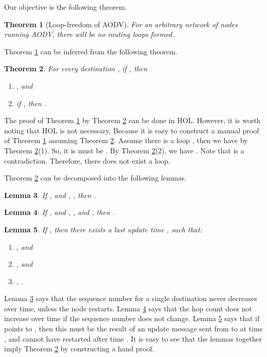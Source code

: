 \documentclass[a4paper,10pt,twocolumn]{article}
\newtheorem{theorem}{Theorem}
\newtheorem{lemma}[theorem]{Lemma}
\begin{document}
Our objective is the following theorem.
\begin{theorem}[Loop-freedom of AODV]\label{BOG02:Lem16}
For an arbitrary network of nodes running AODV, there will be no routing loops formed.
\end{theorem}
Theorem \ref{BOG02:Lem16} can be inferred from the following theorem.
\begin{theorem}\label{BOG02:Lem17}
For every destination , if , then
\begin{enumerate}
  \item , and
  \item if , then .
\end{enumerate}
\end{theorem}
The proof of Theorem \ref{BOG02:Lem16} by Theorem \ref{BOG02:Lem17} can be done in HOL. However, it is worth noting that HOL is not necessary. Because it is easy to construct a manual proof of Theorem \ref{BOG02:Lem16} assuming Theorem \ref{BOG02:Lem17}. Assume there is a loop , then we have  by Theorem \ref{BOG02:Lem17}(1). So, it is must be . By Theorem \ref{BOG02:Lem17}(2), we have . Note that  is a contradiction. Therefore, there does not exist a loop.

Theorem \ref{BOG02:Lem17} can be decomposed into the following lemmas.
\begin{lemma}\label{BOG02:Lem18}
If , and , , then .
\end{lemma}
\begin{lemma}\label{BOG02:Lem19}
If , and , , and , then .
\end{lemma}
\begin{lemma}\label{BOG02:Lem20}
If , then there exists a last update time , such that:
\begin{enumerate}
  \item , and
  \item , and
  \item , .
\end{enumerate}
\end{lemma}

Lemma \ref{BOG02:Lem18} says that the sequence number for a single destination never decreases over time, unless the node restarts. Lemma \ref{BOG02:Lem19} says that the hop count does not increase over time if the sequence number does not change. Lemma \ref{BOG02:Lem20} says that if  points to , then this must be the result of an update message sent from  to  at time , and  cannot have restarted after time . It is easy to see that the lemmas together imply Theorem \ref{BOG02:Lem17} by constructing a hand proof.
\end{document}
